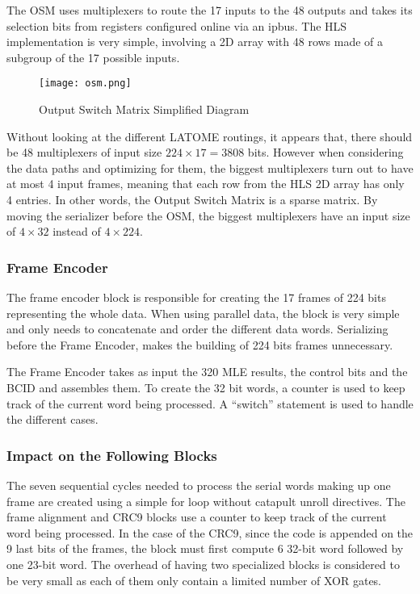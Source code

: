 The OSM uses multiplexers to route the 17 inputs to the 48 outputs and takes its selection bits from registers configured online via an ipbus. The HLS implementation is very simple, involving a 2D array with 48 rows made of a subgroup of the 17 possible inputs.

\begin{figure}
    \centering
    \texttt{[image: osm.png]}
    \caption{Output Switch Matrix Simplified Diagram}
    \label{fig:original-vhdl-design}
\end{figure}

Without looking at the different LATOME routings, it appears that, there should be 48 multiplexers of input size \(224\times17=3808\) bits. However when considering the data paths and optimizing for them, the biggest multiplexers turn out to have at most 4 input frames, meaning that each row from the HLS 2D array has only 4 entries. In other words, the Output Switch Matrix is a sparse matrix. By moving the serializer before the OSM, the biggest multiplexers have an input size of \(4\times32\) instead of \(4\times224\).

\subsubsection{Frame Encoder}

The frame encoder block is responsible for creating the 17 frames of 224 bits representing the whole data. When using parallel data, the block is very simple and only needs to concatenate and order the different data words. Serializing before the Frame Encoder, makes the building of 224 bits frames unnecessary.

The Frame Encoder takes as input the 320 MLE results, the control bits and the BCID and assembles them. To create the 32 bit words, a counter is used to keep track of the current word being processed. A ``switch'' statement is used to handle the different cases.


\subsubsection{Impact on the Following Blocks}

The seven sequential cycles needed to process the serial words making up one frame are created using a simple for loop without catapult unroll directives. The frame alignment and CRC9 blocks use a counter to keep track of the current word being processed. In the case of the CRC9, since the code is appended on the 9 last bits of the frames, the block must first compute 6 32-bit word followed by one 23-bit word. The overhead of having two specialized blocks is considered to be very small as each of them only contain a limited number of XOR gates.

